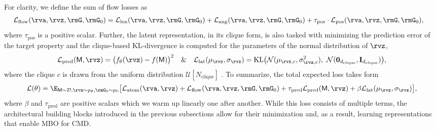 \documentclass{article}
\theoremstyle{plain}
\theoremstyle{definition}
\theoremstyle{remark}
\begin{document}
For clarity, we define the sum of flow losses as
\begin{align}
    \mathcal{L}_{\text{flow}}&(\rva, \rvz, \rmG, \rmG_0)  = \mathcal{L}_{\text{len}}(\rva, \rvz, \rmG, \rmG_{0})
    + \mathcal{L}_{\text{ang}}(\rva, \rvz, \rmG, \rmG_{0})
    + \tau_{\text{pos}}\cdot\mathcal{L}_{\text{pos}}(\rva, \rvz, \rmG, \rmG_{0}),
    \nonumber
\end{align}
where $\tau_{\text{pos}}$ is a positive scalar.
Further, the latent representation, in its clique form, is also tasked with minimizing the prediction error of the target property and the clique-based KL-divergence is computed for the parameters of the normal distribution of $\rvz$,
\begin{align}
    \label{eq:kl}
    \mathcal{L}_{\text{pred}}(\mathsf{M}, \rvz) = \big(f_{\theta}(\rvz) - f(\mathsf{M})\big)^2 \quad \& \quad  
    \mathcal{L}_{\text{lat}}(\mu_{\rvz}, \sigma_{\rvz}) = \text{KL}\big(\mathcal{N}(\mu_{\rvz, c}, \sigma^{2}_{\rvz, c}),\ \mathcal{N}(\mathbf{0}_{d_{\text{clique}}}, \mathbf{I}_{d_{\text{clique}}})\big),
\end{align}
where the clique $c$ is drawn from the uniform distribution $\mathcal{U}[N_{\text{clique}}]$ \citep{kuba2024cliqueformer}. To summarize, the total expected loss takes form
\begin{align}
    \mathcal{L}(\theta) = \E_{\mathsf{M}\sim\mathcal{D}, \rvz\sim p_{\theta}, \rmG_{0}\sim p_{0}}\big[\mathcal{L}_{\text{atom}}(\rva, \rvz) 
    + \mathcal{L}_{\text{flow}}(\rva, \rvz, \rmG, \rmG_0) 
    + \tau_{\text{pred}} \mathcal{L}_{\text{pred}}(\mathsf{M}, \rvz) 
    + \beta  \mathcal{L}_{\text{lat}}(\mu_{\rvz}, \sigma_{\rvz})\big],
    \nonumber
\end{align}
where $\beta$ and $\tau_{\text{pred}}$ are positive scalars which we warm up linearly one after another.
While this loss consists of multiple terms, the architectural building blocks introduced in the previous subsections allow for their minimization and, as a result, learning representations that enable MBO for CMD.
\end{document}
